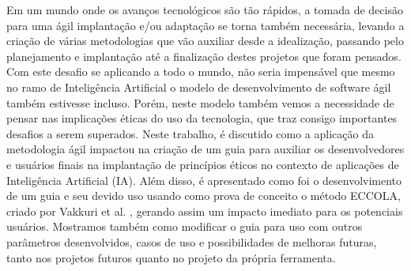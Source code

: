 Em um mundo onde os avanços tecnológicos são tão rápidos, a tomada de decisão para uma ágil implantação e/ou adaptação se torna também necessária, levando a criação de várias metodologias que vão auxiliar desde a idealização, passando pelo planejamento e implantação até a finalização destes projetos que foram pensados. Com este desafio se aplicando a todo o mundo, não seria impensável que mesmo no ramo de Inteligência Artificial o modelo de desenvolvimento de software ágil também estivesse incluso. Porém, neste modelo também vemos a necessidade de pensar nas implicações éticas do uso da tecnologia, que traz consigo importantes desafios a serem superados. Neste trabalho, é discutido como a aplicação da metodologia ágil impactou na criação de um guia para auxiliar os desenvolvedores e usuários finais na implantação de princípios éticos no contexto de aplicações de Inteligência Artificial (IA). Além disso, é apresentado como foi o desenvolvimento de um guia e seu devido uso usando como prova de conceito o método ECCOLA, criado por Vakkuri et al. \cite{ECCOLA}, gerando assim um impacto imediato para os potenciais usuários. Mostramos também como modificar o guia para uso com outros parâmetros desenvolvidos, casos de uso e possibilidades de melhoras futuras, tanto nos projetos futuros quanto no projeto da própria ferramenta.


